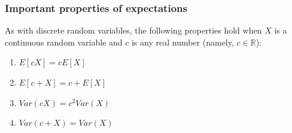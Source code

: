 \documentclass[notes=show,smaller,handout]{beamer}
\renewcommand{\Pr}{P}
\newenvironment{stepenumerate}{\begin{enumerate}[<+->]}{\end{enumerate}}
\begin{document}
%
%
%
%
%
%
%

\begin{frame}%

\frametitle{Important properties of expectations}

 As with discrete random variables, the following properties hold when $%
X$ is a continuous random variable and $c$ is any real number (namely, $c \in \mathbb{R}$):
\vspace{0.5cm}

\begin{stepenumerate}
\item $E\left[ cX\right] =cE\left[ X\right] $ \\ \vspace{0.25cm}

\item $E\left[ c+X\right] =c+E\left[ X\right] $ \\ \vspace{0.25cm}

\item $Var\left( cX\right) =c^{2}Var\left( X\right) $ \\ \vspace{0.25cm}

\item $Var\left( c+X\right) =Var\left( X\right) $
\end{stepenumerate}

\end{frame}%
\end{document}
